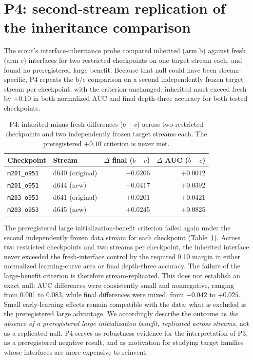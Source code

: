 \documentclass[11pt]{article}
\newcommand{\ckpt}[1]{\texttt{#1}}
\begin{document}
\section{P4: second-stream replication of the inheritance comparison}\label{sec:p4}

The scout's interface-inheritance probe compared inherited (arm b) against fresh (arm c) interfaces for two restricted checkpoints on one target stream each, and found no preregistered large benefit. Because that null could have been stream-specific, P4 repeats the b/c comparison on a second independently frozen target stream per checkpoint, with the criterion unchanged: inherited must exceed fresh by $+0.10$ in both normalized AUC and final depth-three accuracy for both tested checkpoints.

\begin{table}[t]
\centering
\caption{P4: inherited-minus-fresh differences ($b-c$) across two restricted checkpoints and two independently frozen target streams each. The preregistered $+0.10$ criterion is never met.}
\label{tab:p4}
\begin{tabular}{llrr}
\toprule
Checkpoint & Stream & $\Delta$ final ($b-c$) & $\Delta$ AUC ($b-c$) \\
\midrule
\ckpt{m201\_o951} & d640 (original) & $-0.0206$ & $+0.0012$ \\
\ckpt{m201\_o951} & d644 (new)      & $-0.0417$ & $+0.0392$ \\
\ckpt{m203\_o953} & d641 (original) & $+0.0201$ & $+0.0421$ \\
\ckpt{m203\_o953} & d645 (new)      & $+0.0245$ & $+0.0825$ \\
\bottomrule
\end{tabular}
\end{table}

The preregistered large initialization-benefit criterion failed again under the second independently frozen data stream for each checkpoint (Table~\ref{tab:p4}). Across two restricted checkpoints and two streams per checkpoint, the inherited interface never exceeded the fresh-interface control by the required 0.10 margin in either normalized learning-curve area or final depth-three accuracy. The failure of the large-benefit criterion is therefore stream-replicated. This does not establish an exact null: AUC differences were consistently small and nonnegative, ranging from 0.001 to 0.083, while final differences were mixed, from $-0.042$ to $+0.025$. Small early-learning effects remain compatible with the data; what is excluded is the preregistered large advantage. We accordingly describe the outcome as \emph{the absence of a preregistered large initialization benefit, replicated across streams}, not as a replicated null. P4 serves as robustness evidence for the interpretation of P3, as a preregistered negative result, and as motivation for studying target families whose interfaces are more expensive to reinvent.
\end{document}
